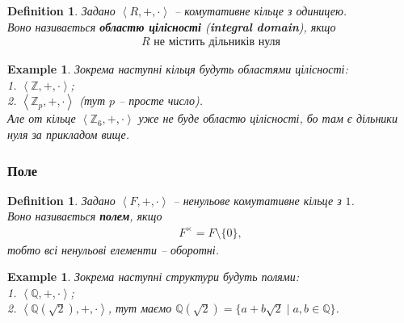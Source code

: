 \documentclass[a4paper, 10pt]{article}
\theoremstyle{theoremdd}
\theoremstyle{theoremdd}
\newtheorem{definition}[theorem]{Definition}
\theoremstyle{theoremdd}
\theoremstyle{theoremdd}
\theoremstyle{theoremdd}
\newtheorem{example}[theorem]{Example}
\theoremstyle{theoremdd}
\theoremstyle{theoremdd}
\theoremstyle{theoremdd}
\theoremstyle{theoremdd}
\theoremstyle{theoremdd}
\theoremstyle{theoremdd}
\newtheorem{remark}[theorem]{Remark}
\theoremstyle{theoremdd}
\theoremstyle{theoremdd}
\theoremstyle{theoremdd}
\theoremstyle{theoremdd}
\begin{document}
\begin{definition}
Задано $\left<R,+,\cdot \right>$ -- комутативне кільце з одиницею.\\
Воно називається \textbf{областю цілісності} (\textbf{integral domain}), якщо
\begin{align*}
R \text{ не містить дільників нуля}
\end{align*}
\end{definition}

\begin{example}
Зокрема наступні кільця будуть областями цілісності:\\
1. $\left< \mathbb{Z},+,\cdot \right>$;\\
2. $\left< \mathbb{Z}_p, +, \cdot \right>$ (тут $p$ -- просте число).\\
Але от кільце $\left< \mathbb{Z}_6, +, \cdot \right>$ уже не буде областю цілісності, бо там є дільники нуля за прикладом вище.
\end{example}

\iffalse
\begin{remark}
Ще раз наголошу собі. Елемент $a$ - дільник нуля, якщо $0 = ab$, де $a,b$ взагалі ненулеві. Інакше це можна позначати як $a \mid 0$. І таким чином, грубо кажучи, $0$ ділиться націло на ненульовий елемент - а результат залишається ненульовим, що дивно для природного розуміння.\\
Тому зазвичай розглядають область цілісності, де такого не відбувається.
\end{remark}
\fi

\subsubsection{Поле}
\begin{definition}
Задано $\left<F,+,\cdot \right>$ -- ненульове комутативне кільце з $1$.\\
Воно називається \textbf{полем}, якщо
\begin{align*}
F^\times = F \setminus \{0\},
\end{align*}
тобто всі ненульові елементи -- оборотні.
\end{definition}

\begin{example}
Зокрема наступні структури будуть полями:\\
1. $\left<\mathbb{Q},+,\cdot \right>$;\\
2. $\left< \mathbb{Q}(\sqrt{2}), +, \cdot \right>$, тут маємо $\mathbb{Q}(\sqrt{2}) = \{a + b \sqrt{2} \mid a,b \in \mathbb{Q}\}$.
\end{example}
\end{document}
